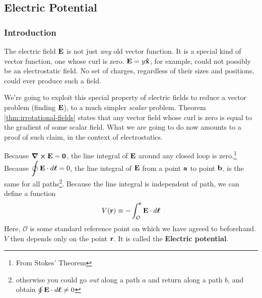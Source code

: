 \subsection{Electric Potential}
	\subsubsection{Introduction}
		\label{subsubsec:electricpotential intro}
		The electric field $\vb E$ is not just \textit{any} old vector function. It is 
		a special kind of vector function, one whose curl is zero. $\vb E = y\vu x$, for 
		example, could not possibly be an electrostatic field. No set of charges, regardless
		of their sizes and positions, could ever produce such a field. 

		We're going to exploit this special property of electric fields to reduce a vector
		problem (finding $\vb{E}$), to a much simpler \textit{scalar} problem. Theorem \ref{thm:irrotational-fields}
		states that any vector field whose curl is zero is equal to the gradient of some scalar
		field. What we are going to do now amounts to a proof of such claim, in the context
		of electrostatics.

		Because $\curl\vb{E}=\vb{0}$, the line integral of $\vb E$ around any closed loop is
		zero.\footnote{From Stokes' Theorem} Because $\displaystyle \oint \vb{E}\cdot\dd{\vb*{\ell}}=0$,
		the line integral of $\vb E$ from a point $\vb a$ to point $\vb b$, is the same for all paths\footnote{otherwise you could go \textit{out} along a path $a$ and return
		along a path $b$, and obtain $\oint\vb{E}\cdot\dd{\vb*{\ell}}\neq0$}. Because the line integral
		is independent of path, we can define a function
		\begin{equation}\label{eq:E_linepath}
			V(\vb{r}) \equiv -\int_{\mathcal{O}}^{\vb{r}} \vb{E}\cdot\dd{\vb*{\ell}}
		\end{equation}
		Here, $\mathcal{O}$ is some standard reference point on which we have agreed to 
		beforehand. $V$ then depends only on the point $\vb r$. It is called the \textbf{Electric potential}.

